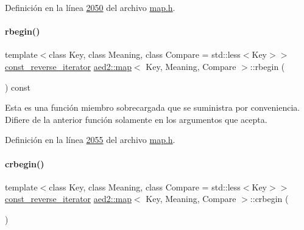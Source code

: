 Definición en la línea \hyperlink{map_8h_source_l02050}{2050} del archivo \hyperlink{map_8h_source}{map.\+h}.

\mbox{\label{classaed2_1_1map_a71ab53ab04f5e35a189c6576fddeb483_a71ab53ab04f5e35a189c6576fddeb483}} 
\paragraph{\texorpdfstring{rbegin()}{rbegin()}\hspace{0.1cm}{\footnotesize\ttfamily [2/2]}}
{\footnotesize\ttfamily template$<$class Key, class Meaning, class Compare = std\+::less$<$\+Key$>$$>$ \\
\hyperlink{classaed2_1_1map_aed66a216549d13078a3ea6978ea0b768_aed66a216549d13078a3ea6978ea0b768}{const\+\_\+reverse\+\_\+iterator} \hyperlink{classaed2_1_1map}{aed2\+::map}$<$ Key, Meaning, Compare $>$\+::rbegin (\begin{DoxyParamCaption}{ }\end{DoxyParamCaption}) const\hspace{0.3cm}{\ttfamily [inline]}}

Esta es una función miembro sobrecargada que se suministra por conveniencia. Difiere de la anterior función solamente en los argumentos que acepta. 

Definición en la línea \hyperlink{map_8h_source_l02055}{2055} del archivo \hyperlink{map_8h_source}{map.\+h}.

\mbox{\label{classaed2_1_1map_a6ad62765a2b2e00247b9e35a7542b448_a6ad62765a2b2e00247b9e35a7542b448}} 
\paragraph{\texorpdfstring{crbegin()}{crbegin()}}
{\footnotesize\ttfamily template$<$class Key, class Meaning, class Compare = std\+::less$<$\+Key$>$$>$ \\
\hyperlink{classaed2_1_1map_aed66a216549d13078a3ea6978ea0b768_aed66a216549d13078a3ea6978ea0b768}{const\+\_\+reverse\+\_\+iterator} \hyperlink{classaed2_1_1map}{aed2\+::map}$<$ Key, Meaning, Compare $>$\+::crbegin (\begin{DoxyParamCaption}{ }\end{DoxyParamCaption})\hspace{0.3cm}{\ttfamily [inline]}}

